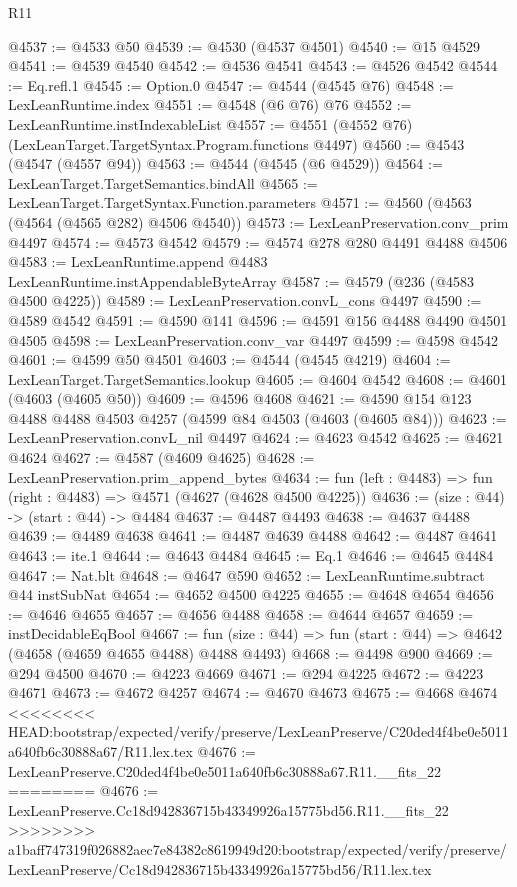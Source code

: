 \begin{lexlean}{R11}
\begin{coremodule}
{{{{{{{{{{{{{{{{{{{{{{{{{{{{{{{{{{{{{{{{{{{{{{{{{{{{{{{{{{{{{{{{{{{{{{{{{{{{{{{{{{{{{{{{{{{{{{{{{{{{{{{{{{@4537 := @4533 @50
@4539 := @4530 (@4537 @4501)
@4540 := @15 @4529
@4541 := @4539 @4540
@4542 := @4536 @4541
@4543 := @4526 @4542
@4544 := Eq.refl.{1}
@4545 := Option.{0}
@4547 := @4544 (@4545 @76)
@4548 := LexLeanRuntime.index
@4551 := @4548 (@6 @76) @76
@4552 := LexLeanRuntime.instIndexableList
@4557 := @4551 (@4552 @76) (LexLeanTarget.TargetSyntax.Program.functions @4497)
@4560 := @4543 (@4547 (@4557 @94))
@4563 := @4544 (@4545 (@6 @4529))
@4564 := LexLeanTarget.TargetSemantics.bindAll
@4565 := LexLeanTarget.TargetSyntax.Function.parameters
@4571 := @4560 (@4563 (@4564 (@4565 @282) @4506 @4540))
@4573 := LexLeanPreservation.conv_prim @4497
@4574 := @4573 @4542
@4579 := @4574 @278 @280 @4491 @4488 @4506
@4583 := LexLeanRuntime.append @4483 LexLeanRuntime.instAppendableByteArray
@4587 := @4579 (@236 (@4583 @4500 @4225))
@4589 := LexLeanPreservation.convL_cons @4497
@4590 := @4589 @4542
@4591 := @4590 @141
@4596 := @4591 @156 @4488 @4490 @4501 @4505
@4598 := LexLeanPreservation.conv_var @4497
@4599 := @4598 @4542
@4601 := @4599 @50 @4501
@4603 := @4544 (@4545 @4219)
@4604 := LexLeanTarget.TargetSemantics.lookup
@4605 := @4604 @4542
@4608 := @4601 (@4603 (@4605 @50))
@4609 := @4596 @4608
@4621 := @4590 @154 @123 @4488 @4488 @4503 @4257 (@4599 @84 @4503 (@4603 (@4605 @84)))
@4623 := LexLeanPreservation.convL_nil @4497
@4624 := @4623 @4542
@4625 := @4621 @4624
@4627 := @4587 (@4609 @4625)
@4628 := LexLeanPreservation.prim_append_bytes
@4634 := fun (left : @4483) => fun (right : @4483) => @4571 (@4627 (@4628 @4500 @4225))
@4636 := (size : @44) -> (start : @44) -> @4484
@4637 := @4487 @4493
@4638 := @4637 @4488
@4639 := @4489 @4638
@4641 := @4487 @4639 @4488
@4642 := @4487 @4641
@4643 := ite.{1}
@4644 := @4643 @4484
@4645 := Eq.{1}
@4646 := @4645 @4484
@4647 := Nat.blt
@4648 := @4647 @590
@4652 := LexLeanRuntime.subtract @44 instSubNat
@4654 := @4652 @4500 @4225
@4655 := @4648 @4654
@4656 := @4646 @4655
@4657 := @4656 @4488
@4658 := @4644 @4657
@4659 := instDecidableEqBool
@4667 := fun (size : @44) => fun (start : @44) => @4642 (@4658 (@4659 @4655 @4488) @4488 @4493)
@4668 := @4498 @900
@4669 := @294 @4500
@4670 := @4223 @4669
@4671 := @294 @4225
@4672 := @4223 @4671
@4673 := @4672 @4257
@4674 := @4670 @4673
@4675 := @4668 @4674
<<<<<<<< HEAD:bootstrap/expected/verify/preserve/LexLeanPreserve/C20ded4f4be0e5011a640fb6c30888a67/R11.lex.tex
@4676 := LexLeanPreserve.C20ded4f4be0e5011a640fb6c30888a67.R11.__fits_22
========
@4676 := LexLeanPreserve.Cc18d942836715b43349926a15775bd56.R11.__fits_22
>>>>>>>> a1baff747319f026882aec7e84382c8619949d20:bootstrap/expected/verify/preserve/LexLeanPreserve/Cc18d942836715b43349926a15775bd56/R11.lex.tex
}}}}}}}}}}}}}}}}}}}}}}}}}}}}}}}}}}}}}}}}}}}}}}}}}}}}}}}}}}}}}}}}}}}}}}}}}}}}}}}}}}}}}}}}}}}}}}}}}}}}}}}}}}
\end{coremodule}
\end{lexlean}
